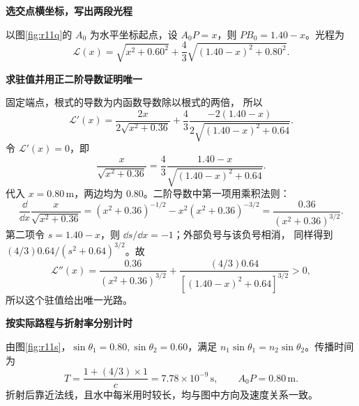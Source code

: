 \begin{solution}\textbf{选交点横坐标，写出两段光程}\par\nobreak
以图\ref{fig:r11q}的 \(A_0\) 为水平坐标起点，设 \(A_0P=x\)，则 \(PB_0=1.40-x\)。光程为
\[
 \mathcal L(x)=\sqrt{x^2+0.60^2}
 +\frac43\sqrt{(1.40-x)^2+0.80^2}.
\]


\par\medskip{}\noindent\textbf{求驻值并用正二阶导数证明唯一}\par\nobreak
固定端点，根式的导数为内函数导数除以根式的两倍，
所以
\[
 \mathcal L'(x)=\frac{2x}{2\sqrt{x^2+0.36}}
 +\frac43\frac{-2(1.40-x)}{2\sqrt{(1.40-x)^2+0.64}}.
\]
令 \(\mathcal L'(x)=0\)，即
\[
 \frac{x}{\sqrt{x^2+0.36}}
 =\frac43\frac{1.40-x}{\sqrt{(1.40-x)^2+0.64}}.
\]
代入 \(x=0.80\,\mathrm m\)，两边均为 \(0.80\)。二阶导数中第一项用乘积法则：
\[
 \frac{\dd}{\dd x}\frac{x}{\sqrt{x^2+0.36}}
 =(x^2+0.36)^{-1/2}-x^2(x^2+0.36)^{-3/2}
 =\frac{0.36}{(x^2+0.36)^{3/2}}.
\]
第二项令 $s=1.40-x$，则 $\dd s/\dd x=-1$；外部负号与该负号相消，
同样得到 $(4/3)0.64/(s^2+0.64)^{3/2}$。故
\[
 \mathcal L''(x)=\frac{0.36}{(x^2+0.36)^{3/2}}
 +\frac{(4/3)0.64}{[(1.40-x)^2+0.64]^{3/2}}>0,
\]
所以这个驻值给出唯一光路。



\par\medskip{}\noindent\textbf{按实际路程与折射率分别计时}\par\nobreak
由图\ref{fig:r11s}，\(\sin\theta_1=0.80,\sin\theta_2=0.60\)，满足 \(n_1\sin\theta_1=n_2\sin\theta_2\)。传播时间为
\[
 \boxed{T=\frac{1+(4/3)\times1}{c}
 =7.78\times10^{-9}\,\mathrm s},\qquad
 \boxed{A_0P=0.80\,\mathrm m}.
\]
折射后靠近法线，且水中每米用时较长，均与图中方向及速度关系一致。
\end{solution}


